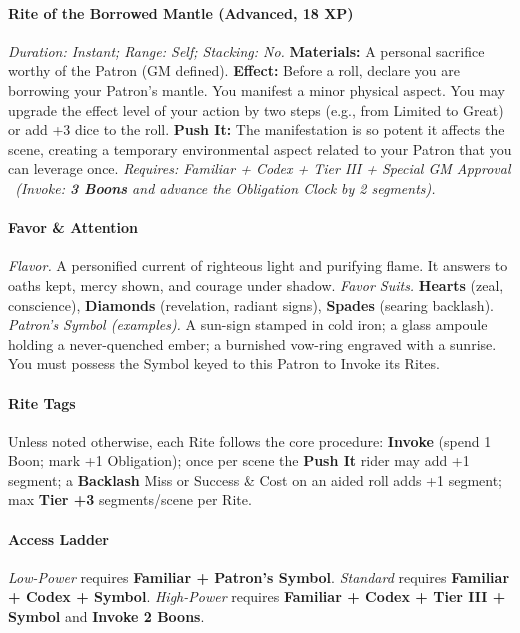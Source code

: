 \documentclass[12pt,twoside]{book}
\begin{document}
\paragraph{Rite of the Borrowed Mantle (Advanced, 18 XP)} \emph{Duration: Instant; Range: Self; Stacking: No.}
\textbf{Materials:} A personal sacrifice worthy of the Patron (GM defined).
\textbf{Effect:} Before a roll, declare you are borrowing your Patron's mantle. You manifest a minor physical aspect. You may upgrade the effect level of your action by two steps (e.g., from Limited to Great) or add +3 dice to the roll.
\textbf{Push It:} The manifestation is so potent it affects the scene, creating a temporary environmental aspect related to your Patron that you can leverage once.
\emph{Requires: Familiar + Codex + Tier III + Special GM Approval \ (\textit{Invoke:} \textbf{3 Boons} and advance the Obligation Clock by 2 segments).}

\paragraph{Favor \& Attention}
\emph{Flavor.} A personified current of righteous light and purifying flame. It answers to oaths kept, mercy shown, and courage under shadow.  
\emph{Favor Suits.} \textbf{Hearts} (zeal, conscience), \textbf{Diamonds} (revelation, radiant signs), \textbf{Spades} (searing backlash).  
\emph{Patron's Symbol (examples).} A sun-sign stamped in cold iron; a glass ampoule holding a never-quenched ember; a burnished vow-ring engraved with a sunrise. You must possess the Symbol keyed to this Patron to Invoke its Rites.

\paragraph{Rite Tags}
Unless noted otherwise, each Rite follows the core procedure: \textbf{Invoke} (spend 1 Boon; mark +1 Obligation); once per scene the \textbf{Push It} rider may add +1 segment; a \textbf{Backlash} Miss or Success \& Cost on an aided roll adds +1 segment; max \textbf{Tier +3} segments/scene per Rite.

\paragraph{Access Ladder}
\emph{Low-Power} requires \textbf{Familiar + Patron's Symbol}. \;\;
\emph{Standard} requires \textbf{Familiar + Codex + Symbol}. \;\;
\emph{High-Power} requires \textbf{Familiar + Codex + Tier III + Symbol} and \textbf{Invoke 2 Boons}.
\end{document}
